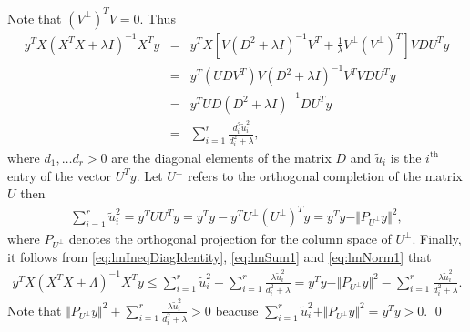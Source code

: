 \documentclass[noinfoline,11pt]{imsart}
\numberwithin{equation}{section}
\theoremstyle{plain}
\newcommand{\lmLambda}{\Lambda}
\newcommand{\lmlambda}{\lambda}
\newcommand{\lmX}{X}
\newcommand{\lmy}{y}
\newcommand{\lmU}{U}
\newcommand{\lmu}{u}
\newcommand{\lmV}{V}
\newcommand{\lmD}{D}
\newcommand{\norm}[1]{ \Vert #1 \Vert }
\begin{document}
Note that  $(\lmV^{\perp})^T \lmV=0$. Thus
\begin{eqnarray}\label{eq:lmSum1}
\lmy^T \lmX \left( \lmX^T\lmX+\lmlambda I\right)^{-1} \lmX^T \lmy 
& =&  \lmy^T \lmX \left[ \lmV(\lmD^2+ \lmlambda I ) ^{-1}\lmV^T +\frac{1}{\lmlambda} \lmV^{\perp} (\lmV^{\perp})^T\right] \lmV\lmD\lmU^T \lmy \nonumber\\
& =&  \lmy^T (\lmU\lmD\lmV^T)  \lmV(\lmD^2+ \lmlambda I ) ^{-1}\lmV^T  \lmV\lmD\lmU^T \lmy \nonumber\\
& =&  \lmy^T\lmU\lmD(\lmD^2+ \lmlambda I )^{-1}\lmD\lmU^T \lmy \nonumber\\
& =& \sum_{i=1}^{r} \frac{d_i^2 \tilde{\lmu}^2_i}{d_i^2+\lmlambda},
\end{eqnarray}
where $d_1, \ldots d_r>0$ are the diagonal elements of the matrix $\lmD$ and $ \tilde{\lmu}_i$ is the $i^{\text{th}}$ entry of the vector $\lmU^T\lmy$.  Let  $\lmU^{\perp}$ refers to the orthogonal completion of the matrix $\lmU$ then 
\begin{eqnarray}\label{eq:lmNorm1}
\sum_{i=1}^{r}  \tilde{\lmu}_i^2= \lmy^T\lmU\lmU^T\lmy=\lmy^T\lmy -\lmy^T \lmU^{\perp} (\lmU^{\perp})^T\lmy = \lmy^T\lmy -\norm{ P_{\lmU^{\perp}}\lmy}^2,
\end{eqnarray}
where $P_{\lmU^{\perp}}$ denotes the orthogonal projection for the column space of ${\lmU^{\perp}}$.  Finally, it follows from \ref{eq:lmIneqDiagIdentity},  \ref{eq:lmSum1} and \ref{eq:lmNorm1}  that 
\begin{eqnarray}
\lmy^T \lmX \left( \lmX^T\lmX+\lmLambda \right)^{-1} \lmX^T \lmy \leq  \sum_{i=1}^{r}  \tilde{\lmu}_i^2 - \sum_{i=1}^{r} \frac{\lmlambda\tilde{\lmu}^2_i}{d_i^2+\lmlambda} = \lmy^T\lmy -\norm{ P_{\lmU^{\perp}}\lmy}^2 - \sum_{i=1}^{r} \frac{\lmlambda\tilde{\lmu}^2_i}{d_i^2+\lmlambda} .\nonumber
\end{eqnarray}
Note that $\norm{ P_{\lmU^{\perp}}\lmy}^2 + \sum_{i=1}^{r} \frac{\lmlambda\tilde{\lmu}^2_i}{d_i^2+\lmlambda} >0$ beacuse $ \sum_{i=1}^{r}  \tilde{\lmu}_i^2+\norm{ P_{\lmU^{\perp}}\lmy}^2=\lmy^T\lmy>0$.
\qed
%
%	

\vspace{.25in}
\end{document}
